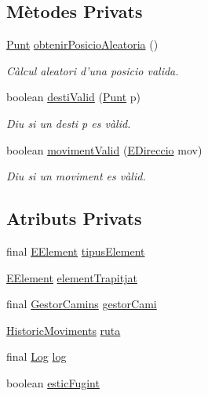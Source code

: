 \subsection*{Mètodes Privats}
\begin{DoxyCompactItemize}
\item 
\hyperlink{classlogica_1_1_punt}{Punt} \hyperlink{classlogica_1_1_item_a0a58b893195f2a56a11ce14deac89b14}{obtenir\+Posicio\+Aleatoria} ()
\begin{DoxyCompactList}\small\item\em Càlcul aleatori d'una posicio valida. \end{DoxyCompactList}\item 
boolean \hyperlink{classlogica_1_1_item_ab86860a660ef6b665576245110578878}{desti\+Valid} (\hyperlink{classlogica_1_1_punt}{Punt} p)
\begin{DoxyCompactList}\small\item\em Diu si un desti p es vàlid. \end{DoxyCompactList}\item 
boolean \hyperlink{classlogica_1_1_item_affda0b78da85d18bc43b71992762df42}{moviment\+Valid} (\hyperlink{enumlogica_1_1enumeracions_1_1_e_direccio}{E\+Direccio} mov)
\begin{DoxyCompactList}\small\item\em Diu si un moviment es vàlid. \end{DoxyCompactList}\end{DoxyCompactItemize}
\subsection*{Atributs Privats}
\begin{DoxyCompactItemize}
\item 
final \hyperlink{enumlogica_1_1enumeracions_1_1_e_element}{E\+Element} \hyperlink{classlogica_1_1_item_a8f4061141a64a72969be035b8d689fb9}{tipus\+Element}
\item 
\hyperlink{enumlogica_1_1enumeracions_1_1_e_element}{E\+Element} \hyperlink{classlogica_1_1_item_a526b80840c8330393362f26926c33f07}{element\+Trapitjat}
\item 
final \hyperlink{classlogica_1_1algoritmica_1_1_gestor_camins}{Gestor\+Camins} \hyperlink{classlogica_1_1_item_a493a6d454882564c734d0f625ae7998b}{gestor\+Cami}
\item 
\hyperlink{classlogica_1_1historic__moviments_1_1_historic_moviments}{Historic\+Moviments} \hyperlink{classlogica_1_1_item_aad60c443c720c3c976474593dec685cc}{ruta}
\item 
final \hyperlink{classlogica_1_1log_1_1_log}{Log} \hyperlink{classlogica_1_1_item_a4da66ecee5634f9dba9015ed82f1ded5}{log}
\item 
boolean \hyperlink{classlogica_1_1_item_af8d84d49ac5ab305f8ddaf457f498740}{estic\+Fugint}
\end{DoxyCompactItemize}
